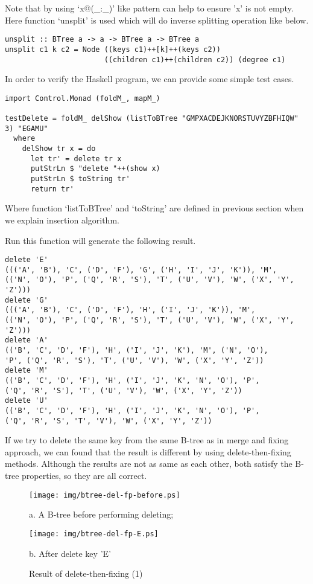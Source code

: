 \documentclass{article}
\begin{document}
Note that by using `x@(\_:\_)' like pattern can help to ensure 'x' is
not empty. Here function `unsplit' is used which will do inverse
splitting operation like below.

\begin{lstlisting}
unsplit :: BTree a -> a -> BTree a -> BTree a
unsplit c1 k c2 = Node ((keys c1)++[k]++(keys c2))
                       ((children c1)++(children c2)) (degree c1)
\end{lstlisting}

In order to verify the Haskell program, we can provide some simple
test cases.

\begin{lstlisting}
import Control.Monad (foldM_, mapM_)

testDelete = foldM_ delShow (listToBTree "GMPXACDEJKNORSTUVYZBFHIQW" 3) "EGAMU"
  where
    delShow tr x = do
      let tr' = delete tr x
      putStrLn $ "delete "++(show x)
      putStrLn $ toString tr'
      return tr'
\end{lstlisting}

Where function `listToBTree' and `toString' are defined in previous section when we
explain insertion algorithm.

Run this function will generate the following result.

\begin{verbatim}
delete 'E'
((('A', 'B'), 'C', ('D', 'F'), 'G', ('H', 'I', 'J', 'K')), 'M',
(('N', 'O'), 'P', ('Q', 'R', 'S'), 'T', ('U', 'V'), 'W', ('X', 'Y', 'Z')))
delete 'G'
((('A', 'B'), 'C', ('D', 'F'), 'H', ('I', 'J', 'K')), 'M',
(('N', 'O'), 'P', ('Q', 'R', 'S'), 'T', ('U', 'V'), 'W', ('X', 'Y', 'Z')))
delete 'A'
(('B', 'C', 'D', 'F'), 'H', ('I', 'J', 'K'), 'M', ('N', 'O'),
'P', ('Q', 'R', 'S'), 'T', ('U', 'V'), 'W', ('X', 'Y', 'Z'))
delete 'M'
(('B', 'C', 'D', 'F'), 'H', ('I', 'J', 'K', 'N', 'O'), 'P',
('Q', 'R', 'S'), 'T', ('U', 'V'), 'W', ('X', 'Y', 'Z'))
delete 'U'
(('B', 'C', 'D', 'F'), 'H', ('I', 'J', 'K', 'N', 'O'), 'P',
('Q', 'R', 'S', 'T', 'V'), 'W', ('X', 'Y', 'Z'))
\end{verbatim}

If we try to delete the same key from the same B-tree as in merge and fixing
approach, we can found that the result is different by using delete-then-fixing
methods. Although the results are not as same as each other, both satisfy
the B-tree properties, so they are all correct.

\begin{figure}[htbp]
    \begin{center}
      \texttt{[image: img/btree-del-fp-before.ps]}

      a. A B-tree before performing deleting;

      \texttt{[image: img/btree-del-fp-E.ps]}

      b. After delete key 'E'
      \caption{Result of delete-then-fixing (1)} \label{fig:result-del-fp1}
    \end{center}
\end{figure}
\end{document}
